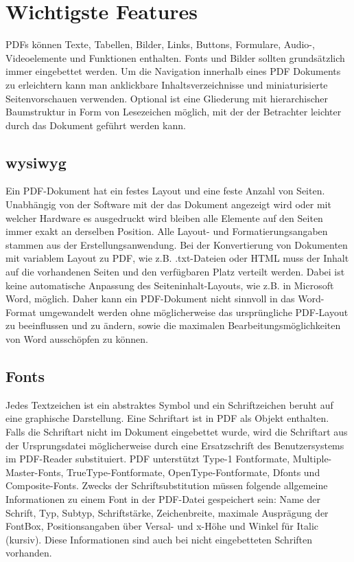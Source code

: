 \section{Wichtigste Features}
PDFs können Texte, Tabellen, Bilder, Links, Buttons, Formulare, Audio-, Videoelemente und Funktionen enthalten. Fonts und Bilder sollten grundsätzlich immer eingebettet werden. Um die Navigation innerhalb eines PDF Dokuments zu erleichtern kann man anklickbare Inhaltsverzeichnisse und miniaturisierte Seitenvorschauen verwenden. Optional ist eine Gliederung mit hierarchischer Baumstruktur in Form von Lesezeichen möglich, mit der der Betrachter leichter durch das Dokument geführt werden kann.

\subsection{\gls{wysiwyg}}
Ein PDF-Dokument hat ein festes Layout und eine feste Anzahl von Seiten. Unabhängig von der Software mit der das Dokument angezeigt wird oder mit welcher Hardware es ausgedruckt wird bleiben alle Elemente auf den Seiten immer exakt an derselben Position. Alle Layout- und Formatierungsangaben stammen aus der Erstellungsanwendung. Bei der Konvertierung von Dokumenten mit variablem Layout zu PDF, wie z.B. .txt-Dateien oder HTML muss der Inhalt auf die vorhandenen Seiten und den verfügbaren Platz verteilt werden. Dabei ist keine automatische Anpassung des Seiteninhalt-Layouts, wie z.B. in Microsoft Word, möglich. Daher kann ein PDF-Dokument nicht sinnvoll in das Word-Format umgewandelt werden ohne möglicherweise das ursprüngliche PDF-Layout zu beeinflussen und zu ändern, sowie die maximalen Bearbeitungsmöglichkeiten von Word ausschöpfen zu können.

\subsection{Fonts}
Jedes Textzeichen ist ein abstraktes Symbol und ein Schriftzeichen beruht auf eine graphische Darstellung. Eine Schriftart ist in PDF als Objekt enthalten. Falls die Schriftart nicht im Dokument eingebettet wurde, wird die Schriftart aus der Ursprungsdatei möglicherweise durch eine Ersatzschrift des Benutzersystems im PDF-Reader substituiert. PDF unterstützt Type-1 Fontformate, Multiple-Master-Fonts, TrueType-Fontformate, OpenType-Fontformate, Dfonts und Composite-Fonts. Zwecks der Schriftsubstitution müssen folgende allgemeine Informationen zu einem Font in der PDF-Datei gespeichert sein: Name der Schrift, Typ, Subtyp, Schriftstärke, Zeichenbreite, maximale Ausprägung der FontBox, Positionsangaben über Versal- und x-Höhe und Winkel für Italic (kursiv). Diese Informationen sind auch bei nicht eingebetteten Schriften vorhanden. \cite{schneeberger}

